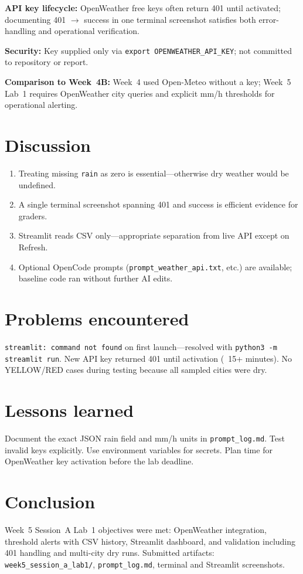 \documentclass[11pt,a4paper]{article}
\begin{document}
\textbf{API key lifecycle:} OpenWeather free keys often return 401 until activated; documenting 401 $\rightarrow$ success in one terminal screenshot satisfies both error-handling and operational verification.

\textbf{Security:} Key supplied only via \texttt{export OPENWEATHER\_API\_KEY}; not committed to repository or report.

\textbf{Comparison to Week~4B:} Week~4 used Open-Meteo without a key; Week~5 Lab~1 requires OpenWeather city queries and explicit mm/h thresholds for operational alerting.

\section{Discussion}
\begin{enumerate}[noitemsep]
  \item Treating missing \texttt{rain} as zero is essential---otherwise dry weather would be undefined.
  \item A single terminal screenshot spanning 401 and success is efficient evidence for graders.
  \item Streamlit reads CSV only---appropriate separation from live API except on Refresh.
  \item Optional OpenCode prompts (\texttt{prompt\_weather\_api.txt}, etc.) are available; baseline code ran without further AI edits.
\end{enumerate}

\section{Problems encountered}
\texttt{streamlit: command not found} on first launch---resolved with \texttt{python3 -m streamlit run}. New API key returned 401 until activation (~15+ minutes). No YELLOW/RED cases during testing because all sampled cities were dry.

\section{Lessons learned}
Document the exact JSON rain field and mm/h units in \texttt{prompt\_log.md}. Test invalid keys explicitly. Use environment variables for secrets. Plan time for OpenWeather key activation before the lab deadline.

\section{Conclusion}
Week~5 Session~A Lab~1 objectives were met: OpenWeather integration, threshold alerts with CSV history, Streamlit dashboard, and validation including 401 handling and multi-city dry runs. Submitted artifacts: \texttt{week5\_session\_a\_lab1/}, \texttt{prompt\_log.md}, terminal and Streamlit screenshots.
\end{document}
